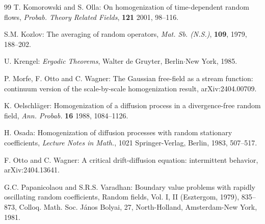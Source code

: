 \documentclass[11pt,draft, reqno]{amsart}
\theoremstyle{definition}
\numberwithin{equation}{section}
\begin{document}
\begin{thebibliography}{99}
  T. Komorowski and S. Olla: On homogenization of time-dependent random flows,
\emph{Probab. Theory Related Fields}, \textbf{121} 2001, 98--116.


 S.M. Kozlov: The averaging of random operators,  \emph{Mat. Sb. (N.S.)}, \textbf{109}, 1979, 188--202.


 U. Krengel: \emph{Ergodic Theorems}, Walter de Gruyter, Berlin$\cdot$New York, 1985.










  P. Morfe, F. Otto and C. Wagner: The Gaussian free-field as a stream function: continuum version of the scale-by-scale homogenization result,
arXiv:2404.00709.


 K. Oelschl\"ager: Homogenization of a diffusion process in a divergence-free random field,
\emph{Ann. Probab.} \textbf{16} 1988, 1084--1126.

 H. Osada: Homogenization of diffusion processes with random stationary coefficients,
\emph{Lecture Notes in Math.}, 1021
Springer-Verlag, Berlin, 1983, 507--517.

  F. Otto and C. Wagner: A critical drift-diffusion equation: intermittent behavior,
arXiv:2404.13641.


 G.C. Papanicolaou and S.R.S. Varadhan: Boundary value problems with rapidly oscillating random coefficients,
Random fields, Vol. I, II (Esztergom, 1979), 835--873,
Colloq. Math. Soc. J\'anos Bolyai, 27, North-Holland, Amsterdam-New York, 1981.


\end{thebibliography}
\end{document}
